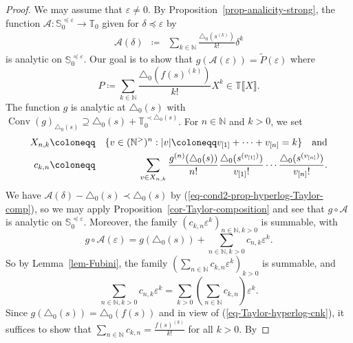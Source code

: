 \documentclass{article}
\newcommand{\assign}{\coloneqq}
\newcommand{\of}{:}
\newcommand{\suchthat}{:}
\newcommand{\tmop}[1]{\ensuremath{\operatorname{#1}}}
\theoremstyle{remark}\newtheorem*{convention*}{Convention}
\begin{document}
\begin{proof}
  We may assume that $\varepsilon \neq 0$. By
  Proposition~\ref{prop-analicity-strong}, the function $\mathcal{A} \of
  \mathbb{S}^{\preccurlyeq \varepsilon}_0 \longrightarrow \mathbb{T}_0$ given
  for $\delta \preccurlyeq \varepsilon$ by
  \begin{eqnarray*}
    \mathcal{A} (\delta) & \assign & \sum_{k \in \mathbb{N}} \frac{\triangle_0
    (s^{(k)})}{k!} \delta^k
  \end{eqnarray*}
  is analytic on $\mathbb{S}^{\preccurlyeq \varepsilon}_0$. Our goal is to
  show that $g (\mathcal{A} (\varepsilon)) = \tilde{P} (\varepsilon)$ where
  \[ P \assign \sum_{k \in \mathbb{N}} \frac{\triangle_0 (f (s)^{(k)})}{k!}
     X^k \in \mathbb{T} \llbracket X \rrbracket . \]
  The function $g$ is analytic at $\triangle_0 (s)$ with $\tmop{Conv}
  (g)_{\triangle_0 (s)} \supseteq \triangle_0 (s) +\mathbb{T}_0^{\prec
  \triangle_0 (s)}$. For $n \in \mathbb{N}$ and $k > 0$, we set
  \begin{eqnarray*}
    X_{n, k} & \assign & \{ v \in (\mathbb{N}^{>})^n \suchthat | v | \assign
    v_{[1]} + \cdots + v_{[n]} = k \} \text{\quad and}\\
    c_{k, n} & \assign & \sum_{v \in X_{n, k}} \frac{g^{(n)} (\triangle_0
    (s))}{n!}  \frac{\triangle_0 (s^{(v_{[1]})})}{v_{[1]} !} \cdots
    \frac{\triangle_0 (s^{(v_{[n]})})}{v_{[n]} !} .
  \end{eqnarray*}
  We have $\mathcal{A} (\delta) - \triangle_0 (s) \prec \triangle_0 (s)$ by
  (\ref{eq-cond2-prop-hyperlog-Taylor-comp}), so we may apply
  Proposition~\ref{cor-Taylor-composition} and see that $g \circ \mathcal{A}$
  is analytic on $\mathbb{S}_0^{\preccurlyeq \varepsilon}$. Moreover, the
  family $(c_{k, n} \varepsilon^k)_{n \in \mathbb{N}, k > 0}$ is summable,
  with
  \begin{equation}
    g \circ \mathcal{A} (\varepsilon) = g (\triangle_0 (s)) + \sum_{n \in
    \mathbb{N}, k > 0} c_{n, k} \varepsilon^k . \label{eq-Taylor-hyperlog-cnk}
  \end{equation}
  So by Lemma~\ref{lem-Fubini}, the family $\left( \sum_{n \in \mathbb{N}}
  c_{k, n} \varepsilon^k \right)_{k > 0}$ is summable, and
  \[ \sum_{n \in \mathbb{N}, k > 0} c_{n, k} \varepsilon^k = \sum_{k > 0}
     \left( \sum_{n \in \mathbb{N}} c_{k, n} \right) \varepsilon^k . \]
  Since $g (\triangle_0 (s)) = \triangle_0 (f (s))$ and in view of
  (\ref{eq-Taylor-hyperlog-cnk}), it suffices to show that $\sum_{n \in
  \mathbb{N}} c_{k, n} = \frac{f (s)^{(k)}}{k!}$ for all $k > 0$. By

\end{proof}
\end{document}
